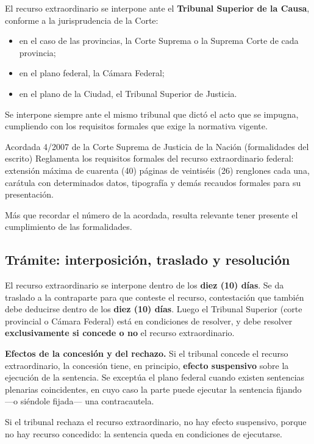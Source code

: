 \documentclass[12pt,oneside]{book}
\begin{document}
El recurso extraordinario se interpone ante el \textbf{Tribunal Superior de la Causa}, conforme a la jurisprudencia de la Corte:

\begin{itemize}
    \item en el caso de las provincias, la Corte Suprema o la Suprema Corte de cada provincia;
    \item en el plano federal, la Cámara Federal;
    \item en el plano de la Ciudad, el Tribunal Superior de Justicia.
\end{itemize}

Se interpone siempre ante el mismo tribunal que dictó el acto que se impugna, cumpliendo con los requisitos formales que exige la normativa vigente.

\begin{norma}{Acordada 4/2007 de la Corte Suprema de Justicia de la Nación (formalidades del escrito)}
Reglamenta los requisitos formales del recurso extraordinario federal: extensión máxima de cuarenta (40) páginas de veintiséis (26) renglones cada una, carátula con determinados datos, tipografía y demás recaudos formales para su presentación.
\end{norma}

Más que recordar el número de la acordada, resulta relevante tener presente el cumplimiento de las formalidades.

\subsection{Trámite: interposición, traslado y resolución}

El recurso extraordinario se interpone dentro de los \textbf{diez (10) días}. Se da traslado a la contraparte para que conteste el recurso, contestación que también debe deducirse dentro de los \textbf{diez (10) días}. Luego el Tribunal Superior (corte provincial o Cámara Federal) está en condiciones de resolver, y debe resolver \textbf{exclusivamente si concede o no} el recurso extraordinario.

\begin{important}
\textbf{Efectos de la concesión y del rechazo.} Si el tribunal concede el recurso extraordinario, la concesión tiene, en principio, \textbf{efecto suspensivo} sobre la ejecución de la sentencia. Se exceptúa el plano federal cuando existen sentencias plenarias coincidentes, en cuyo caso la parte puede ejecutar la sentencia fijando —o siéndole fijada— una contracautela.

Si el tribunal rechaza el recurso extraordinario, no hay efecto suspensivo, porque no hay recurso concedido: la sentencia queda en condiciones de ejecutarse.
\end{important}
\end{document}
